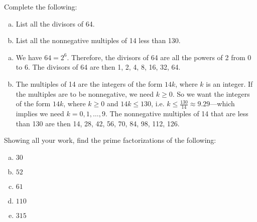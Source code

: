 \documentclass[11pt,letterpaper]{article}
\begin{document}

 Complete the following:
	\begin{enumerate}[(a)]
	\item List all the divisors of 64.
	\item List all the nonnegative multiples of 14 less than 130. 
	\end{enumerate} \pspace

\sol 
\begin{enumerate}[(a)]
\item We have $64= 2^6$. Therefore, the divisors of 64 are all the powers of 2 from 0 to 6. The divisors of 64 are then 1, 2, 4, 8, 16, 32, 64. \pspace

\item The multiples of 14 are the integers of the form $14k$, where $k$ is an integer. If the multiples are to be nonnegative, we need $k \geq 0$. So we want the integers of the form $14k$, where $k \geq 0$ and $14k \leq 130$, i.e. $k \leq \frac{130}{14} \approx 9.29$---which implies we need $k= 0, 1, \ldots, 9$. The nonnegative multiples of 14 that are less than 130 are then 14, 28, 42, 56, 70, 84, 98, 112, 126. 
\end{enumerate}



\newpage



 Showing all your work, find the prime factorizations of the following:
	\begin{enumerate}[(a)]
	\item $30$
	\item $52$
	\item $61$
	\item $110$
	\item $315$
	\end{enumerate} \pspace
\end{document}
